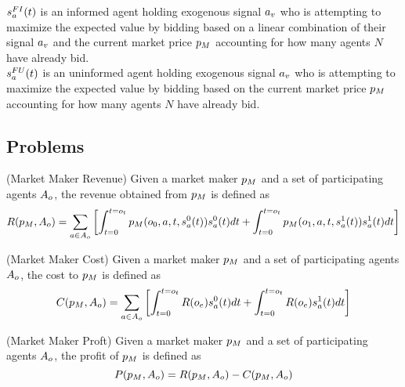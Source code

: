 $s^{FI}_a(t)$ is an informed agent holding exogenous signal $a_v$ who is attempting to maximize the expected value by bidding based on a linear combination of their signal $a_v$ and the current market price $p_M$ accounting for how many agents $N$ have already bid. \\

$s^{FU}_a(t)$ is an uninformed agent holding exogenous signal $a_v$ who is attempting to maximize the expected value by bidding based on the current market price $p_M$ accounting for how many agents $N$ have already bid. \\

\subsection{Problems}
  
  \begin{definition} (Market Maker Revenue)
  \label{def:mmr}
   Given a market maker $p_M$ and a set of participating agents
   $A_o$, the revenue obtained from $p_M$ is defined as
     $$R(p_M, A_o) = 
      \sum_{a\in A_o} \left[
	\int_{t = 0}^{t = o_t} 
	  p_M(o_0,a,t, s^{0}_{a}(t))s^{0}_{a}(t)dt
	  + \int_{t = 0}^{t = o_t} 
	  p_M(o_1,a,t, s^{1}_{a}(t))s^{1}_{a}(t)dt\right]$$
  \end{definition}
  
    \begin{definition} (Market Maker Cost)
  \label{def:mmc}
   Given a market maker $p_M$ and a set of participating agents
   $A_o$, the cost to $p_M$ is defined as
     $$ C(p_M, A_o) =
     \sum_{a\in A_o} \left[
	\int_{t = 0}^{t = o_t} 
	R(o_e)s^{0}_{a}(t)dt
	+\int_{t = 0}^{t = o_t} 
	R(o_e)s^{1}_{a}(t)dt
	\right]$$
  \end{definition}

      \begin{definition} (Market Maker Proft)
  \label{def:mmf}
   Given a market maker $p_M$ and a set of participating agents
   $A_o$, the profit of $p_M$ is defined as
     $$ P(p_M, A_o) = R(p_M, A_o) 
     - C(p_M, A_o)$$
  \end{definition}
  
